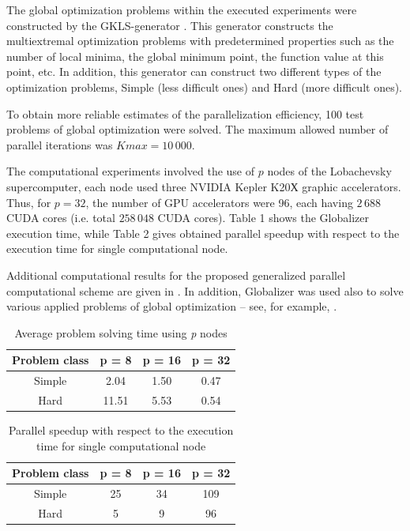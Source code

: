 \documentclass[12pt]{amsart}
\begin{document}
The global optimization problems within the executed experiments were constructed by the GKLS-generator \cite{Gaviano}. This generator constructs the multiextremal optimization problems with predetermined properties such as the number of local minima, the global minimum point, the function value at this point, etc. In addition, this generator can construct two different types of the optimization problems, Simple (less difficult ones) and Hard (more difficult ones).

To obtain more reliable estimates of the parallelization efficiency, 100 test problems of global optimization were solved. The maximum allowed number of parallel iterations was $Kmax = 10\,000$.

The computational experiments involved the use of $p$ nodes of the Lobachevsky supercomputer, each node used three NVIDIA Kepler K20Х graphic accelerators. Thus, for $p = 32$, the number of GPU accelerators were 96, each having $2\,688$ CUDA cores (i.e. total $258\,048$ CUDA cores). Table 1 shows the Globalizer execution time, while Table 2 gives obtained parallel speedup with respect to the execution time for single computational node.

Additional computational results for the proposed generalized parallel computational scheme are given in \cite{Gergel1, Gergel2, Barkalov, Gergel3, Gergel4}. In addition, Globalizer was used also to solve various applied problems of global optimization -- see, for example, \cite{Modorskii, Gergel6}.

\begin{table}
	\caption{Average problem solving time using \textit{p} nodes}
	\label{tab:tab1}
	\center
	\begin{tabular}{|c|c|c|c|}
	\hline 
		Problem class & \parbox[c]{1.6cm}{ \centering p = 8 } & 
		\parbox[c]{1.6cm}{ \centering p = 16 } &
		\parbox[c]{1.6cm}{ \centering p = 32 } \\
	\hline 
		Simple &  2.04 & 1.50 & 0.47 \\
	\hline 
		Hard   & 11.51 & 5.53 & 0.54 \\
	\hline 
	\end{tabular}
\end{table}

\begin{table}
	\caption{Parallel speedup with respect to the execution time for single computational node}
	\label{tab:tab2}
	\center
	\begin{tabular}{|c|c|c|c|}
	\hline 
		Problem class & \parbox[c]{1.6cm}{ \centering p = 8 } & 
		\parbox[c]{1.6cm}{ \centering p = 16 } &
		\parbox[c]{1.6cm}{ \centering p = 32 } \\
	\hline 
		Simple & 25 & 34 & 109 \\
	\hline 
		Hard   & 5  & 9  & 96  \\
	\hline 
	\end{tabular}
\end{table}
\end{document}
